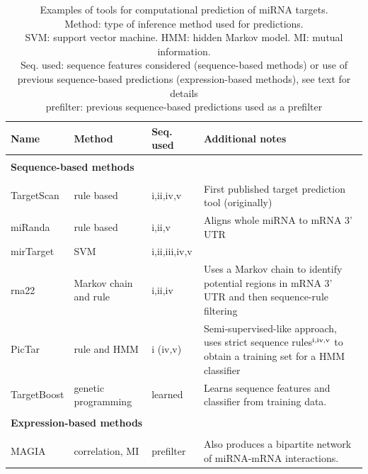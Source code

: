 \begin{table}
  \caption{Examples of tools for computational prediction of miRNA targets. \\
  Method: type of inference method used for predictions. \\
  SVM: support vector machine. HMM: hidden Markov model. MI: mutual information. \\
  Seq. used: sequence features considered (sequence-based methods) or use of
  previous sequence-based predictions (expression-based methods), see text for details \\
  prefilter: previous sequence-based predictions used as a prefilter
  }
  \label{table:prediction-methods}
  {\fontsize{10pt}{13pt}\selectfont
  \begin{tabular}{ lp{3cm}lp{5cm} }
    \hline
    \textbf{Name} & \textbf{Method} & \textbf{Seq. used} & \textbf{Additional notes} \\
    \hline \\
    \multicolumn{4}{l}{\textbf{Sequence-based methods}} \\
    \\[-.3cm]
    TargetScan \citep{Agarwal2015}  & rule based            & i,ii,iv,v     & First published target prediction tool (originally) \\
    miRanda \citep{Betel2008}       & rule based            & i,ii,v        & Aligns whole miRNA to mRNA 3' UTR \\
    mirTarget \citep{Wang2008}      & SVM                   & i,ii,iii,iv,v &  \\
    rna22 \citep{Miranda2006}       & Markov chain and rule & i,ii,iv       & Uses a Markov chain to identify potential regions in mRNA 3' UTR and then sequence-rule filtering \\
    PicTar \citep{Krek2005}         & rule and HMM          & i (iv,v)      & Semi-supervised-like approach, uses strict sequence rules$^{\textup{i,iv,v}}$ to obtain a training set for a HMM classifier \\
    TargetBoost \citep{Saetrom2005} & genetic \mbox{programming} & learned  & Learns sequence features and classifier from training data. \\
    \\
    \multicolumn{4}{l}{\textbf{Expression-based methods}} \\
    \\[-.3cm]
    MAGIA \citep{Sales2010}               & correlation, MI               & prefilter & Also produces a bipartite network of miRNA-mRNA interactions. \\

\end{tabular}}
\end{table}
